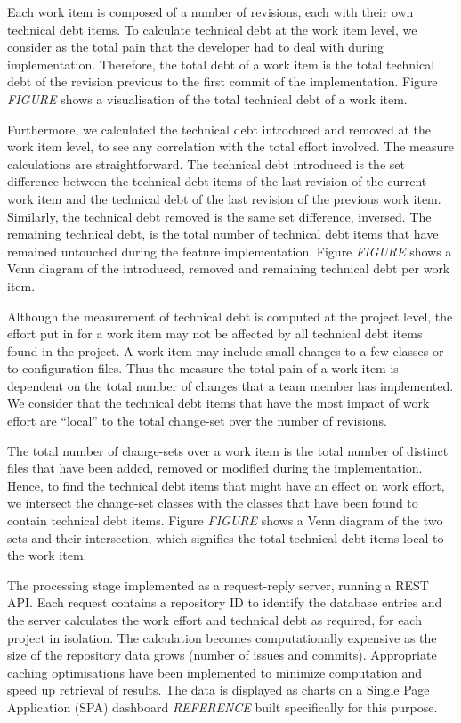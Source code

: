 \documentclass{mpaper}
\begin{document}
Each work item is composed of a number of revisions, each with their own
technical debt items. To calculate technical debt at the work item level, we
consider as the total pain that the developer had to deal with during
implementation. Therefore, the total debt of a work item is the total technical
debt of the revision previous to the first commit of the implementation. Figure
\emph{FIGURE} shows a visualisation of the total technical debt of a work item.  

Furthermore, we calculated the technical debt introduced and removed at the work
item level, to see any correlation with the total effort involved. The measure
calculations are straightforward. The technical debt introduced is the set
difference between the technical debt items of the last revision of the current
work item and the technical debt of the last revision of the previous work item.
Similarly, the technical debt removed is the same set difference, inversed. The
remaining technical debt, is the total number of technical debt items that have
remained untouched during the feature implementation. Figure \emph{FIGURE} shows
a Venn diagram of the introduced, removed and remaining technical debt per work
item. 

Although the measurement of technical debt is computed at the project level, the
effort put in for a work item may not be affected by all technical debt items
found in the project. A work item may include small changes to a few classes or
to configuration files. Thus the measure the total pain of a work item is
dependent on the total number of changes that a team member has implemented. We
consider that the technical debt items that have the most impact of work effort
are ``local'' to the total change-set over the number of revisions.

The total number of change-sets over a work item is the total number of distinct
files that have been added, removed or modified during the implementation.
Hence, to find the technical debt items that might have an effect on work
effort, we intersect the change-set classes with the classes that have been
found to contain technical debt items. Figure \emph{FIGURE} shows a Venn diagram
of the two sets and their intersection, which signifies the total technical debt
items local to the work item.

The processing stage  implemented as a request-reply server, running a REST API.
Each request contains a repository ID to identify the database entries and the
server calculates the work effort and technical debt as required, for each
project in isolation. The calculation becomes computationally expensive as the
size of the repository data grows (number of issues and commits). Appropriate
caching optimisations have been implemented to minimize computation and speed up
retrieval of results. The data is displayed as charts on a Single Page
Application (SPA) dashboard \emph{REFERENCE} built specifically for this
purpose. 
\end{document}
